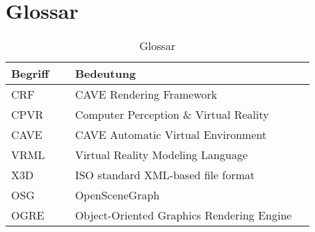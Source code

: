 \chapter{Glossar}

\begin{table}[ht]
\begin{tabular}{|p{0.2\linewidth}|p{0.75\linewidth}|}
\hline \bfseries Begriff & \bfseries Bedeutung \\ \hline
\hline CRF 	& CAVE Rendering Framework\\
\hline CPVR & Computer Perception \& Virtual Reality \\ 
\hline CAVE & CAVE Automatic Virtual Environment \\
\hline VRML & Virtual Reality Modeling Language \\
\hline X3D & ISO standard XML-based file format \\
\hline OSG & OpenSceneGraph \\
\hline OGRE & Object-Oriented Graphics Rendering Engine \\
\hline
\end{tabular}
\caption{Glossar}
\end{table}